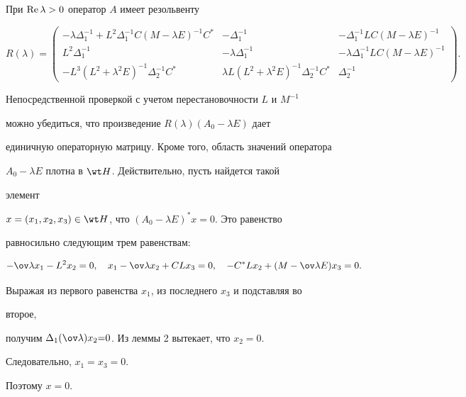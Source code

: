  


 


\begin{lem} 


При $\operatorname{Re}\lambda>0$ оператор $A$ имеет резольвенту


$$ 


R(\lambda)= 


\begin{pmatrix} 


-\lambda\Delta^{-1}_1+L^2\Delta^{-1}_1C(M-\lambda E)^{-1}C^* & 


-\Delta^{-1}_1 & -\Delta^{-1}_1LC(M-\lambda E)^{-1} \\ 


% 


L^2\Delta^{-1}_1 & -\lambda\Delta^{-1}_1 & 


-\lambda\Delta^{-1}_1LC(M-\lambda E)^{-1} \\ 


% 


-L^3(L^2+\lambda^2E)^{-1}\Delta^{-1}_2C^* & 


\lambda L(L^2+\lambda^2E)^{-1}\Delta^{-1}_2C^* & \Delta^{-1}_2 


\end{pmatrix} 


. 


$$ 


\end{lem} 


 


 


\begin{pf} 


Непосредственной проверкой с учетом перестановочности $L$ и $M^{-1}$ 


можно убедиться, что произведение $R(\lambda)(A_0-\lambda E)$ дает 


единичную операторную матрицу. Кроме того, область значений оператора 


$A_0-\lambda E$ плотна в $\wt H$. Действительно, пусть найдется такой 


элемент 


$x=(x_1,x_2,x_3)\in\wt H$, что $(A_0-\lambda E)^*x=0$. Это равенство 


равносильно следующим трем равенствам: 


$$ 


-\ov\lambda x_1-L^2x_2=0,\quad 


x_1-\ov\lambda x_2+CLx_3=0,\quad 


-C^*Lx_2+(M-\ov\lambda E)x_3=0. 


$$ 


Выражая из первого равенства $x_1$, из последнего $x_3$ и подставляя во 


второе, 


получим $\Delta_1(\ov\lambda)x_2{=}0$. Из леммы 2 вытекает, что $x_2=0$. 


Следовательно, $x_1=x_3=0$. 


Поэтому $x=0$. 


\end{pf} 


